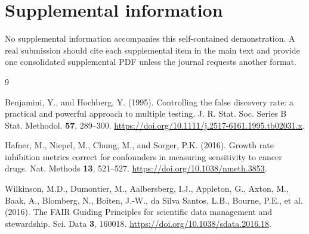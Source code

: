 \section{Supplemental information}
No supplemental information accompanies this self-contained demonstration. A
real submission should cite each supplemental item in the main text and provide
one consolidated supplemental PDF unless the journal requests another format.

\clearpage
\begin{thebibliography}{9}

Benjamini, Y., and Hochberg, Y. (1995). Controlling the false discovery rate: a
practical and powerful approach to multiple testing. J. R. Stat. Soc. Series B
Stat. Methodol. \textbf{57}, 289--300.
\href{https://doi.org/10.1111/j.2517-6161.1995.tb02031.x}
{https://doi.org/10.1111/j.2517-6161.1995.tb02031.x}.

Hafner, M., Niepel, M., Chung, M., and Sorger, P.K. (2016). Growth rate
inhibition metrics correct for confounders in measuring sensitivity to cancer
drugs. Nat. Methods \textbf{13}, 521--527.
\href{https://doi.org/10.1038/nmeth.3853}
{https://doi.org/10.1038/nmeth.3853}.

Wilkinson, M.D., Dumontier, M., Aalbersberg, I.J., Appleton, G., Axton, M.,
Baak, A., Blomberg, N., Boiten, J.-W., da Silva Santos, L.B., Bourne, P.E.,
et al. (2016). The FAIR Guiding Principles for scientific data management and
stewardship. Sci. Data \textbf{3}, 160018.
\href{https://doi.org/10.1038/sdata.2016.18}
{https://doi.org/10.1038/sdata.2016.18}.

\end{thebibliography}

\clearpage
